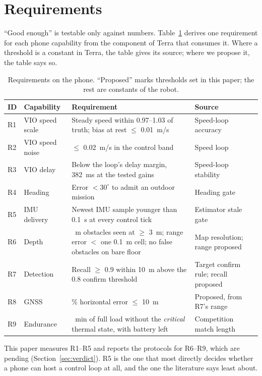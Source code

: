 \documentclass[conference]{IEEEtran}
\begin{document}
\section{Requirements}
\label{sec:req}

``Good enough'' is testable only against numbers.
Table~\ref{tab:req} derives one requirement for each phone capability from the component of Terra that consumes it.
Where a threshold is a constant in Terra, the table gives its source; where we propose it, the table says so.

\begin{table}[t]
\centering
\caption{Requirements on the phone. ``Proposed'' marks thresholds set in this paper; the rest are constants of the robot.}
\label{tab:req}
\footnotesize
\setlength{\tabcolsep}{3pt}
\begin{tabularx}{\columnwidth}{@{}l >{\raggedright\arraybackslash}p{1.25cm} >{\raggedright\arraybackslash}X >{\raggedright\arraybackslash}p{1.6cm}@{}}
\toprule
ID & Capability & Requirement & Source \\
\midrule
R1 & VIO speed scale & Steady speed within 0.97--1.03 of truth; bias at rest $\le$ 0.01~m/s & Speed-loop accuracy \\
R2 & VIO speed noise & $\le$ 0.02~m/s in the control band & Speed loop \\
R3 & VIO delay & Below the loop's delay margin, 382~ms at the tested gains & Speed-loop stability \\
R4 & Heading & Error $< 30^\circ$ to admit an outdoor mission & Heading gate \\
R5 & IMU delivery & Newest IMU sample younger than 0.1~s at every control tick & Estimator stale gate \\
R6 & Depth & 0.15~m obstacles seen at $\ge$ 3~m; range error $<$ one 0.1~m cell; no false obstacles on bare floor & Map resolution; range proposed \\
R7 & Detection & Recall $\ge$ 0.9 within 10~m above the 0.8 confirm threshold & Target confirm rule; recall proposed \\
R8 & GNSS & 95\% horizontal error $\le$ 10~m & Proposed, from R7's range \\
R9 & Endurance & 90~min of full load without the \emph{critical} thermal state, with battery left & Competition match length \\
\bottomrule
\end{tabularx}
\end{table}

This paper measures R1--R5 and reports the protocols for R6--R9, which are pending (Section~\ref{sec:verdict}).
R5 is the one that most directly decides whether a phone can host a control loop at all, and the one the literature says least about.
\end{document}
